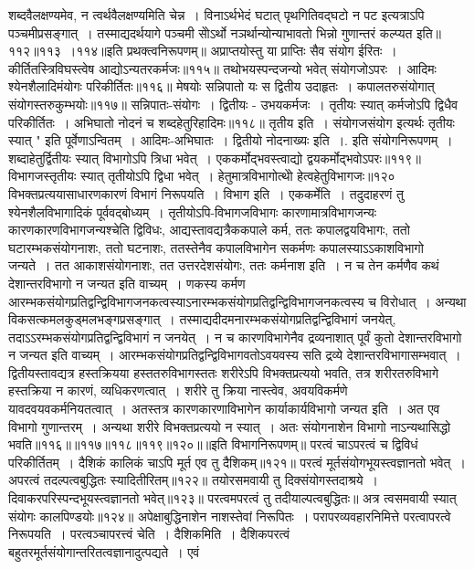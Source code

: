 शब्दवैलक्षण्यमेव, न त्वर्थवैलक्षण्यमिति चेन्न~। विनाऽर्थभेदं घटात् पृथगितिवद्घटो न पट इत्यत्राऽपि पञ्चमीप्रसङ्गात्~। तस्माद्यदर्थयागे पञ्चमी सोेऽर्थो नञर्थान्योन्याभावतो
भिन्नो गुणान्तरं कल्प्यत इति॥११२॥११३~।११४॥इति प्रथक्त्वनिरूपणम्॥
अप्राप्तयोस्तु या प्राप्तिः सैव संयोग ईरितः~।
कीर्तितस्त्रिविघस्त्वेष आद्योऽन्यतरकर्मजः॥११५॥
तथोभयस्पन्दजन्यो भवेत् संयोगजोऽपरः~।
आदिमः श्येनशैलादिमंयोगः परिकीर्तितः॥११६॥
मेषयोः सन्निपातो यः स द्वितीय उदाहृतः~।
कपालतरुसंयोगात् संयोगस्तरुकुम्भयोः॥११७॥
सन्निपातः-संयोगः~। द्वितीयः - उभयकर्मजः~।
तृतीयः स्यात् कर्मजोऽपि द्विधैव परिकीर्तितः~।
अभिघातो नोदनं च शब्दहेतुरिहादिमः॥११८॥
तृतीय इति~। संयोगजसंयोग इत्यर्थः तृतीयः स्यात् " इति पूर्वेणाऽन्वितम्~।
आदिमः-अभिघातः~। द्वितीयो नोदनाख्यः इति~।. इति संयोगनिरूपणम्~।
शब्दाहेतुर्द्वितीयः स्यात् विभागोऽपि त्रिधा भवेत्~।
एककर्मोद्भवस्त्वाद्यो द्वयकर्मोद्भवोऽपरः॥११९॥
विभागजस्तृतीयः स्यात् तृतीयोऽपि द्विधा भवेत्~।
हेतुमात्रविभागोत्थोे हेत्वहेतुविभागजः॥१२०
विभक्तप्रत्ययासाधारणकारणं विभागं निरूपयति~। विभाग इति~।
एककर्मेति~। तदुदाहरणं तु श्येनशैलविभागादिकं पूर्ववद्बोध्यम्~।
तृतीयोऽपि-विभागजविभागः कारणामात्रविभागजन्यः कारणकारणविभागजन्यश्चेति द्विविधः, आद्यस्तावद्यत्रैककपाले कर्म, ततः कपालद्वयविभागः, ततो
घटारम्भकसंयोगनाशः, ततो घटनाशः, ततस्तेनैव कपालविभागेन सकर्मणः कपालस्याऽऽकाशविभागो जन्यते~। तत आकाशसंयोगनाशः, तत उत्तरदेशसंयोगः, ततः
कर्मनाश इति~। न च तेन कर्मणैव कथं देशान्तरविभागो न जन्यत इति वाच्यम्~। णकस्य कर्मण आरम्भकसंयोगप्रतिद्वन्द्विविभागजनकत्वस्याऽनारम्भकसंयोगप्रतिद्वन्द्विविभागजनकत्वस्य
च विरोधात्~। अन्यथा विकसत्कमलकुड्मलभङ्गप्रसङ्गात्~। तस्माद्यदीदमनारम्भकसंयोगप्रतिद्वन्द्विविभागं जनयेत्, तदाऽऽरम्भकसंयोगप्रतिद्वन्द्विविभागं न जनयेत्~। न च
कारणविभागेनैव द्रव्यनाशात् पूर्वं कुतो देशान्तरविभागो न जन्यत इति वाच्यम्~। आरम्भकसंयोगप्रतिद्वन्द्विविभागवतोऽवयवस्य सति द्रव्ये देशान्तरविभागासम्भवात्~।
द्वितीयस्तावद्यत्र हस्तक्रियया हस्ततरुविभागस्ततः शरीरेऽपि विभक्तप्रत्ययो भवति, तत्र शरीरतरुविभागे हस्तक्रिया न कारणं, व्यधिकरणत्वात्~। शरीरे तु क्रिया नास्त्वेव,
अवयविकर्मणे यावदवयवकर्मनियतत्वात्~। अतस्तत्र कारणकारणाविभागेन कार्याकार्यविभागो जन्यत इति~। अत एव विभागो गुणान्तरम्~। अन्यथा शरीरे विभक्तप्रत्ययो
न स्यात्~। अतः संयोगनाशेन विभागो नाऽन्यथासिद्धो भवति॥११६॥॥११७॥११८॥११९॥१२०॥॥इति विभागनिरूपणम्॥
परत्वं चाऽपरत्वं च द्विविधं परिकीर्तितम्~।
दैशिकं कालिकं चाऽपि मूर्त एव तु दैशिकम्॥१२१॥
परत्वं मूर्तसंयोगभूयस्त्वज्ञानतो भवेत्~।
अपरत्वं तदल्पत्वबुद्धितः स्यादितीरितम्॥१२२॥
तयोरसमवायी तु दिक्संयोगस्तदाश्रये~।
दिवाकरपरिस्पन्दभूयस्त्वज्ञानतो भवेत्॥१२३॥
परत्वमपरत्वं तु तदीयाल्पत्वबुद्धितः॥
अत्र त्वसमवायी स्यात् संयोगः कालपिण्डयोः॥१२४॥
अपेक्षाबुद्धिनाशेन नाशस्तेवां निरूपितः~।
परापरव्यवहारनिमित्ते परत्वापरत्वे निरूपयति~। परत्वञ्चापरत्त्वं चेति~। दैशिकमिति~। दैशिकपरत्वं बहुतरमूर्तसंयोगान्तरितत्वज्ञानादुत्पद्यते~। एवं
